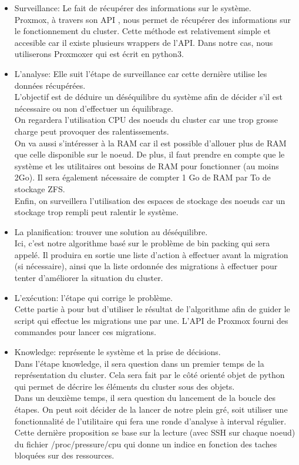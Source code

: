 \documentclass[14pt]{extarticle}
\begin{document}
    \begin{itemize}[nosep,label=\textendash]
        \item Surveillance: Le fait de récupérer des informations sur le système.\\
        Proxmox, à travers son API \cite{api}, nous permet de récupérer des informations sur le fonctionnement du cluster. Cette méthode est relativement simple et accesible car il existe plusieurs wrappers de l'API. Dans notre cas, nous utiliserons Proxmoxer \cite{proxmoxer} qui est écrit en python3.\\
        \item L'analyse: Elle suit l'étape de surveillance car cette dernière utilise les données récupérées.\\
        L'objectif est de déduire un déséquilibre du système afin de décider s'il est nécessaire ou non d'effectuer un équilibrage.\\
        On regardera l'utilisation CPU des noeuds du cluster car une trop grosse charge peut provoquer des ralentissements.\\
        On va aussi s'intéresser à la RAM car il est possible d'allouer plus de RAM que celle disponible sur le noeud. De plus, il faut prendre en compte que le système et les utilitaires ont besoins de RAM pour fonctionner (au moins 2Go). Il sera également nécessaire de compter 1 Go de RAM par To de stockage ZFS.\\
        Enfin, on surveillera l'utilisation des espaces de stockage des noeuds car un stockage trop rempli peut ralentir le système.
        \item La planification: trouver une solution au déséquilibre.\\
        Ici, c'est notre algorithme basé sur le problème de bin packing qui sera appelé. Il produira en sortie une liste d'action à effectuer avant la migration (si nécessaire), ainsi que la liste ordonnée des migrations à effectuer pour tenter d'améliorer la situation du cluster.
        \item L'exécution: l'étape qui corrige le problème.\\
        Cette partie à pour but d'utiliser le résultat de l'algorithme afin de guider le script qui effectue les migrations une par une. L'API de Proxmox fourni des commandes pour lancer ces migrations.
        \item Knowledge: représente le système et la prise de décisions.\\
        Dans l'étape knowledge, il sera question dans un premier temps de la représentation du cluster. Cela sera fait par le côté orienté objet de python qui permet de décrire les éléments du cluster sous des objets.\\
        Dans un deuxième temps, il sera question du lancement de la boucle des étapes. On peut soit décider de la lancer de notre plein gré, soit utiliser une fonctionnalité de l'utilitaire qui fera une ronde d'analyse à interval régulier. 
        Cette dernière proposition se base sur la lecture (avec SSH sur chaque noeud) du fichier /proc/pressure/cpu \cite{kernel_psi} qui donne un indice en fonction des taches bloquées sur des ressources.
    \end{itemize}
\end{document}

